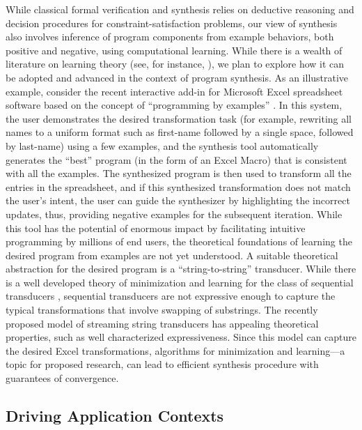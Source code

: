 While classical formal verification and synthesis relies on deductive reasoning and decision procedures for constraint-satisfaction problems, our view of synthesis also involves inference of program components from example behaviors, both positive and negative, using computational learning. While there is a wealth of literature on learning theory (see, for instance, \cite{KeVa94}), we plan to explore how it can be adopted and advanced in the context of program synthesis. As an illustrative example, consider the recent interactive add-in for Microsoft Excel spreadsheet software based on the concept of ``programming by examples'' \cite{Gulwani11,Gulwani16}. In this system, the user demonstrates the desired transformation task (for example, rewriting all names to a uniform format such as first-name followed by a single space, followed by last-name) using a few examples, and the synthesis tool automatically generates the “best” program (in the form of an Excel Macro) that is consistent with all the examples. The synthesized program is then used to transform all the entries in the spreadsheet, and if this synthesized transformation does not match the user’s intent, the user can guide the synthesizer by highlighting the incorrect updates, thus, providing negative examples for the subsequent iteration. 
While this tool  has the potential of enormous impact by facilitating intuitive programming by millions of end users, the theoretical foundations of learning the desired program from examples are not yet understood. 
A suitable theoretical abstraction for the desired program is a ``string-to-string'' transducer. While there is a well developed theory of minimization and learning for the class of sequential transducers \cite{Mohri00}, sequential transducers are not expressive enough to capture the typical transformations that involve swapping of substrings. The recently proposed model of streaming string transducers \cite{AlurC11} has appealing theoretical properties, such as well characterized expressiveness. Since this model can capture the desired Excel transformations, algorithms for minimization and learning—a topic for proposed research, can lead to efficient synthesis procedure with guarantees of convergence.


\subsection{Driving Application Contexts}


